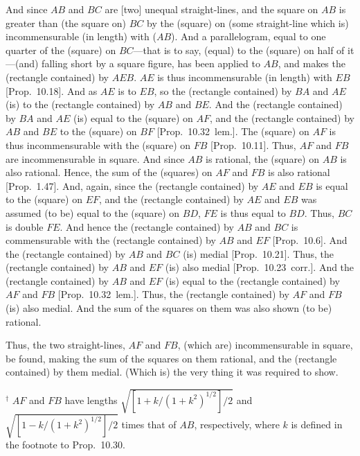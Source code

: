 \begin{Parallel}{}{}
{And since $AB$ and $BC$ are [two] unequal straight-lines, and the square
on $AB$ is greater than (the square on) $BC$ by the (square) on (some
straight-line which is) incommensurable (in length) with ($AB$). And a parallelogram,
equal to one quarter of the (square) on $BC$---that is to say, (equal) to the
(square) on half of it---(and) falling short by a square figure, has
been applied to $AB$, and  makes the (rectangle contained) by $AEB$.
$AE$ is thus incommensurable (in length) with $EB$ [Prop.~10.18]. And as $AE$ is to $EB$, so the
(rectangle contained) by $BA$ and $AE$ (is) to the (rectangle contained) by
$AB$ and $BE$.
 And the (rectangle contained) by $BA$ and $AE$ (is) equal to the (square) on $AF$, and the (rectangle contained) by $AB$ and $BE$ to the (square) on
$BF$ [Prop.~10.32~lem.]. The (square) on
$AF$ is thus incommensurable with the (square) on $FB$ [Prop.~10.11]. Thus, $AF$ and $FB$ are
incommensurable in square. And since $AB$ is rational,
the (square) on $AB$ is also rational. Hence, the sum of the
(squares) on $AF$ and $FB$ is also rational [Prop.~1.47]. And, again, since the (rectangle
contained) by $AE$ and $EB$ is equal to the (square) on $EF$, and
the (rectangle contained) by $AE$ and $EB$ 
was assumed (to be) equal to the (square) on $BD$, $FE$ is thus equal to $BD$. Thus, $BC$
is double $FE$. And hence the (rectangle contained) by $AB$ and $BC$ is commensurable with the (rectangle contained) by $AB$ and $EF$ [Prop.~10.6]. And the (rectangle contained) by
$AB$ and $BC$ (is) medial [Prop.~10.21]. 
Thus, the (rectangle contained) by $AB$ and $EF$ (is) also medial
[Prop.~10.23~corr.].  And the (rectangle contained)
by $AB$ and $EF$ (is) equal to the (rectangle contained) by $AF$ and $FB$
[Prop.~10.32~lem.]. Thus, the (rectangle
contained) by $AF$ and $FB$ (is) also medial. And the
sum of the squares on them was also shown (to be) rational.

Thus, the two straight-lines, $AF$ and $FB$, (which are)
incommensurable in  square, be found, making the
sum of the squares on them rational, and the (rectangle contained)
by them medial. (Which is) the very thing it was required to show.}
\end{Parallel}
{\footnotesize\noindent$^\dag$ $AF$ and $FB$ have lengths
$\sqrt{[1+k/(1+k^2)^{1/2}]/2}$ and $\sqrt{[1-k/(1+k^2)^{1/2}]/2}$
times that of $AB$, respectively, where $k$ is defined in the footnote
to Prop.~10.30.}


